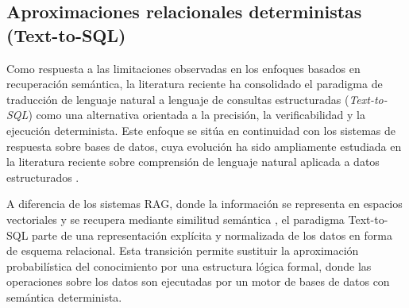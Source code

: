 \subsection{Aproximaciones relacionales deterministas (Text-to-SQL)}


Como respuesta a las limitaciones observadas en los enfoques basados en recuperación semántica, la literatura reciente ha consolidado el paradigma de traducción de lenguaje natural a lenguaje de consultas estructuradas (\textit{Text-to-SQL}) como una alternativa orientada a la precisión, la verificabilidad y la ejecución determinista. Este enfoque se sitúa en continuidad con los sistemas de respuesta sobre bases de datos, cuya evolución ha sido ampliamente estudiada en la literatura reciente sobre comprensión de lenguaje natural aplicada a datos estructurados \citep{yu2018spider, zhong2017seq2sql}.

A diferencia de los sistemas RAG, donde la información se representa en espacios vectoriales y se recupera mediante similitud semántica \citep{lewis2020retrieval, gao2023ragsurvey}, el paradigma Text-to-SQL parte de una representación explícita y normalizada de los datos en forma de esquema relacional. Esta transición permite sustituir la aproximación probabilística del conocimiento por una estructura lógica formal, donde las operaciones sobre los datos son ejecutadas por un motor de bases de datos con semántica determinista.

